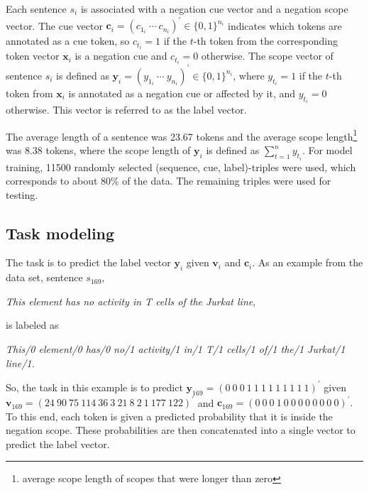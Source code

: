 \documentclass{article}
\begin{document}
\begin{multicols}{2}
Each sentence $s_i$ is associated with a negation cue vector and a negation scope vector. The cue vector $\mathbf{c}_i = (c_{1_i}~\cdots~c_{n_i})^{\prime} \in \{0,1\}^{n_i}$ indicates which tokens are annotated as a cue token, so $c_{t_i}=1$ if the $t$-th token from the corresponding token vector $\mathbf{x}_i$ is a negation cue and $c_{t_i}=0$ otherwise. The scope vector of sentence $s_i$ is defined as $\mathbf{y}_i=(y_{1_i}~\cdots~y_{n_i})^{\prime} \in \{0,1\}^{n_i}$, where $y_{t_i}=1$ if the $t$-th token from $\mathbf{x}_i$ is annotated as a negation cue or affected by it, and $y_{t_i}=0$ otherwise. This vector is referred to as the label vector.

The average length of a sentence was 23.67 tokens and the average scope length\footnote{average scope length of scopes that were longer than zero} was 8.38 tokens, where the scope length of $\mathbf{y}_i$ is defined as $\sum_{t=1}^{n} y_{t_i}$. For model training, 11500 randomly selected (sequence, cue, label)-triples were used, which corresponds to about 80\% of the data. The remaining triples were used for testing.

\subsection{Task modeling} 
The task is to predict the label vector $\mathbf{y}_i$ given $\mathbf{v}_i$ and $\mathbf{c}_i$. As an example from the data set, sentence $s_{169}$,

\begin{center}
\textit{This element has no activity in T cells of the Jurkat line},
\end{center}

is labeled as

\begin{center}
\textit{This/0 element/0 has/0 no/1 activity/1 in/1 T/1 cells/1 of/1 the/1 Jurkat/1 line/1.}
\end{center}

So, the task in this example is to predict $\mathbf{y}_{169}=(0~0~0~1~1~1~1~1~1~1~1~1)^{\prime}$ given $\mathbf{v}_{169}=(24~90~75~114~36~3~21~8~2~1~177~122)^{\prime}$ and $\mathbf{c}_{169}=(0~0~0~1~0~0~0~0~0~0~0~0)^{\prime}.$ To this end, each token is given a predicted probability that it is inside the negation scope. These probabilities are then concatenated into a single vector to predict the label vector. 


\end{multicols}
\end{document}
